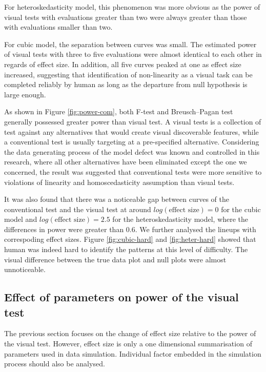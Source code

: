 \documentclass[]{interact}
\theoremstyle{plain}%
\theoremstyle{definition}
\theoremstyle{remark}
\begin{document}
For heteroskedasticity model, this phenomenon was more obvious as the
power of visual tests with evaluations greater than two were always
greater than those with evaluations smaller than two.

For cubic model, the separation between curves was small. The estimated
power of visual tests with three to five evaluations were almost
identical to each other in regards of effect size. In addition, all five
curves peaked at one as effect size increased, suggesting that
identification of non-linearity as a visual task can be completed
reliably by human as long as the departure from null hypothesis is large
enough.

As shown in Figure \ref{fig:power-com}, both F-test and Breusch--Pagan
test generally possessed greater power than visual test. A visual tests
is a collection of test against any alternatives that would create
visual discoverable features, while a conventional test is usually
targeting at a pre-specified alternative. Considering the data
generating process of the model defect was known and controlled in this
research, where all other alternatives have been eliminated except the
one we concerned, the result was suggested that conventional tests were
more sensitive to violations of linearity and homoscedasticity
assumption than visual tests.

It was also found that there was a noticeable gap between curves of the
conventional test and the visual test at around
\(log(\text{effect size}) = 0\) for the cubic model and
\(log(\text{effect size}) = 2.5\) for the heteroskedasticity model,
where the differences in power were greater than 0.6. We further
analysed the lineups with correspoding effect sizes. Figure
\ref{fig:cubic-hard} and \ref{fig:heter-hard} showed that human was
indeed hard to identify the patterns at this level of difficulty. The
visual difference between the true data plot and null plots were almost
unnoticeable.

\hypertarget{effect-of-parameters-on-power-of-the-visual-test}{%
\subsection{Effect of parameters on power of the visual
test}\label{effect-of-parameters-on-power-of-the-visual-test}}

The previous section focuses on the change of effect size relative to
the power of the visual test. However, effect size is only a one
dimensional summarisation of parameters used in data simulation.
Individual factor embedded in the simulation process should also be
analysed.
\end{document}
